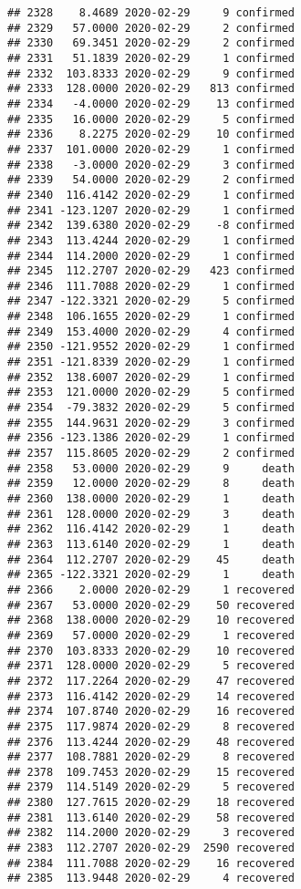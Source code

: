 \documentclass[
]{article}
\begin{document}
\begin{verbatim}
## 2328    8.4689 2020-02-29     9 confirmed
## 2329   57.0000 2020-02-29     2 confirmed
## 2330   69.3451 2020-02-29     2 confirmed
## 2331   51.1839 2020-02-29     1 confirmed
## 2332  103.8333 2020-02-29     9 confirmed
## 2333  128.0000 2020-02-29   813 confirmed
## 2334   -4.0000 2020-02-29    13 confirmed
## 2335   16.0000 2020-02-29     5 confirmed
## 2336    8.2275 2020-02-29    10 confirmed
## 2337  101.0000 2020-02-29     1 confirmed
## 2338   -3.0000 2020-02-29     3 confirmed
## 2339   54.0000 2020-02-29     2 confirmed
## 2340  116.4142 2020-02-29     1 confirmed
## 2341 -123.1207 2020-02-29     1 confirmed
## 2342  139.6380 2020-02-29    -8 confirmed
## 2343  113.4244 2020-02-29     1 confirmed
## 2344  114.2000 2020-02-29     1 confirmed
## 2345  112.2707 2020-02-29   423 confirmed
## 2346  111.7088 2020-02-29     1 confirmed
## 2347 -122.3321 2020-02-29     5 confirmed
## 2348  106.1655 2020-02-29     1 confirmed
## 2349  153.4000 2020-02-29     4 confirmed
## 2350 -121.9552 2020-02-29     1 confirmed
## 2351 -121.8339 2020-02-29     1 confirmed
## 2352  138.6007 2020-02-29     1 confirmed
## 2353  121.0000 2020-02-29     5 confirmed
## 2354  -79.3832 2020-02-29     5 confirmed
## 2355  144.9631 2020-02-29     3 confirmed
## 2356 -123.1386 2020-02-29     1 confirmed
## 2357  115.8605 2020-02-29     2 confirmed
## 2358   53.0000 2020-02-29     9     death
## 2359   12.0000 2020-02-29     8     death
## 2360  138.0000 2020-02-29     1     death
## 2361  128.0000 2020-02-29     3     death
## 2362  116.4142 2020-02-29     1     death
## 2363  113.6140 2020-02-29     1     death
## 2364  112.2707 2020-02-29    45     death
## 2365 -122.3321 2020-02-29     1     death
## 2366    2.0000 2020-02-29     1 recovered
## 2367   53.0000 2020-02-29    50 recovered
## 2368  138.0000 2020-02-29    10 recovered
## 2369   57.0000 2020-02-29     1 recovered
## 2370  103.8333 2020-02-29    10 recovered
## 2371  128.0000 2020-02-29     5 recovered
## 2372  117.2264 2020-02-29    47 recovered
## 2373  116.4142 2020-02-29    14 recovered
## 2374  107.8740 2020-02-29    16 recovered
## 2375  117.9874 2020-02-29     8 recovered
## 2376  113.4244 2020-02-29    48 recovered
## 2377  108.7881 2020-02-29     8 recovered
## 2378  109.7453 2020-02-29    15 recovered
## 2379  114.5149 2020-02-29     5 recovered
## 2380  127.7615 2020-02-29    18 recovered
## 2381  113.6140 2020-02-29    58 recovered
## 2382  114.2000 2020-02-29     3 recovered
## 2383  112.2707 2020-02-29  2590 recovered
## 2384  111.7088 2020-02-29    16 recovered
## 2385  113.9448 2020-02-29     4 recovered

\end{verbatim}
\end{document}
